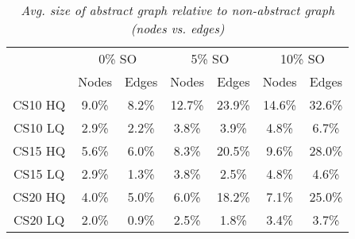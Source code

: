 \begin{table}[ht]
\begin{center}
\caption{\small{\emph{Avg. size of abstract graph relative to non-abstract graph (nodes vs. edges)}}}
\label{aha-table:graphsize}
\begin{tabular*}{0.49\textwidth}{@{\extracolsep{\fill}}ccccccc}%
  \hline
 & \multicolumn{2}{c}{\small{0\% SO}} & \multicolumn{2}{c}{\small{5\% SO}} & \multicolumn{2}{c}{\small{10\% SO}} \\
 & \small{Nodes} & \small{Edges} & \small{Nodes} & \small{Edges} & \small{Nodes} & \small{Edges} \\
  \hline
  \small{CS10 HQ} & \small{9.0\%} & \small{8.2\%} & \small{12.7\%} & \small{23.9\%} & \small{14.6\%} & \small{32.6\%} \\
  \small{CS10 LQ} & \small{2.9\%} & \small{2.2\%} & \small{3.8\%}  & \small{3.9\%}  & \small{4.8\%}  & \small{6.7\%} \\
  \small{CS15 HQ} & \small{5.6\%} & \small{6.0\%} & \small{8.3\%}  & \small{20.5\%} & \small{9.6\%}  & \small{28.0\%} \\
  \small{CS15 LQ} & \small{2.9\%} & \small{1.3\%} & \small{3.8\%}  & \small{2.5\%}  & \small{4.8\%}  & \small{4.6\%} \\
  \small{CS20 HQ} & \small{4.0\%} & \small{5.0\%} & \small{6.0\%}  & \small{18.2\%} & \small{7.1\%}  & \small{25.0\%} \\
  \small{CS20 LQ} & \small{2.0\%} & \small{0.9\%} & \small{2.5\%}  & \small{1.8\%}  & \small{3.4\%}  & \small{3.7\%} \\
   \hline
\end{tabular*}
\end{center}
\end{table}

